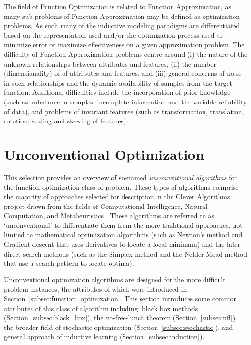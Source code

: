 \documentclass[a4paper, 11pt]{article}
\begin{document}
The field of Function Optimization is related to Function Approximation, as many-sub-problems of Function Approximation may be defined as optimization problems. As such many of the inductive modeling paradigms are differentiated based on the representation used and/or the optimization process used to minimize error or maximize effectiveness on a given approximation problem. 
The difficulty of Function Approximation problems centre around (i) the nature of the unknown relationships between attributes and features, (ii) the number (dimensionality) of of attributes and features, and (iii) general concerns of noise in such relationships and the dynamic availability of samples from the target function.
Additional difficulties include the incorporation of prior knowledge (such as imbalance in samples, incomplete information and the variable reliability of data), and problems of invariant features (such as transformation, translation, rotation, scaling and skewing of features).


% 
% 
\section{Unconventional Optimization}
\label{sec:unconventional_optimization}
This selection provides an overview of so-named \emph{unconventional algorithms} for the function optimization class of problem. These types of algorithms comprise the majority of approaches selected for description in the Clever Algorithms project drawn from the fields of Computational Intelligence, Natural Computation, and Metaheuristics \cite{Brownlee2010b}. 
These algorithms are referred to as `unconventional' to differentiate them from the more traditional approaches, not limited to mathematical optimization algorithms (such as Newton's method and Gradient descent that uses derivatives to locate a local minimum) and the later direct search methods (such as the Simplex method and the Nelder-Mead method that use a search pattern to locate optima).

Unconventional optimization algorithms are designed for the more difficult problem instances, the attributes of which were introduced in Section~\ref{subsec:function_optimization}. This section introduces some common attributes of this class of algorithm including: black box methods (Section~\ref{subsec:black_box}), the no-free-lunch theorem (Section~\ref{subsec:nfl}), the broader field of stochastic optimization (Section~\ref{subsec:stochastic}), and general approach of inductive learning (Section~\ref{subsec:induction}).
\end{document}
